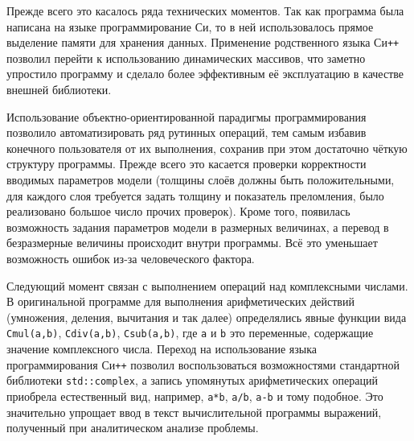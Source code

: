 Прежде всего это касалось ряда технических моментов. Так как программа
была написана на языке программирование Си, то в ней использовалось
прямое выделение памяти для хранения данных.  Применение
родственного языка Си\texttt{++} позволил перейти к использованию
динамических массивов, что заметно упростило
программу и сделало более эффективным её эксплуатацию в качестве
внешней библиотеки.

Использование объектно-ориентированной парадигмы программирования
позволило автоматизировать ряд рутинных операций, тем самым избавив
конечного пользователя от их выполнения, сохранив при этом достаточно
чёткую структуру программы.  Прежде всего это касается проверки
корректности вводимых параметров модели (толщины слоёв должны быть
положительными, для каждого слоя требуется задать толщину и показатель
преломления, было реализовано большое число прочих проверок). Кроме
того, появилась возможность задания параметров модели в размерных
величинах, а перевод в безразмерные величины происходит внутри
программы. Всё это уменьшает возможность ошибок из-за человеческого
фактора.

Следующий момент связан с выполнением операций над комплексными
числами.  В оригинальной программе для выполнения арифметических
действий (умножения, деления, вычитания и так далее) определялись
явные функции вида \verb+Cmul(a,b)+, \verb+Cdiv(a,b)+,
\verb+Csub(a,b)+, где \verb+a+ и \verb+b+ это переменные, содержащие
значение комплексного числа.  Переход на использование языка
программирования Си\texttt{++} позволил воспользоваться возможностями
стандартной библиотеки \verb+std::complex+, а запись упомянутых
арифметических операций приобрела естественный вид, например,
\verb!a*b!, \verb!a/b!, \verb!a-b! и тому подобное.  Это значительно
упрощает ввод в текст вычислительной программы выражений, полученный
при аналитическом анализе проблемы.

